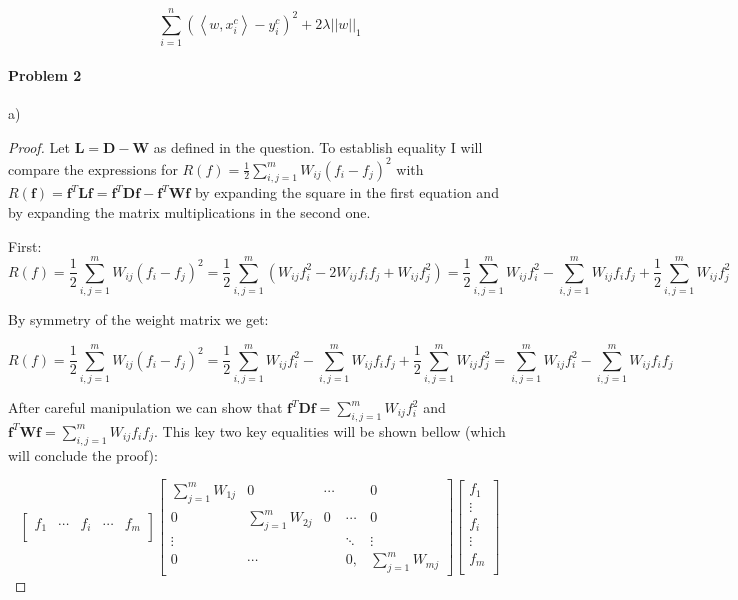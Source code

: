 \documentclass[12pt]{report}
\begin{document}
$$
\boxed{
\sum_{i=1}^n (\left\langle w, x_i^c \right\rangle - y_i^c) ^2 +  2 \lambda ||w||_1
}
$$

\paragraph{Problem 2}
a)


\begin{proof} Let $\mathbf{L} = \mathbf{D} - \mathbf{W}$ as defined in the question. 
To establish equality I will compare the expressions for $R(f) = \frac{1}{2}\sum^m_{i,j=1} W_{ij}(f_i - f_j)^2$ with $R(\mathbf{f}) = \mathbf{f}^T\mathbf{L}\mathbf{f} = \mathbf{f}^T\mathbf{D}\mathbf{f} - \mathbf{f}^T\mathbf{W}\mathbf{f} $ by expanding the square in the first equation and by expanding the matrix multiplications in the second one.

First:
 $$R(f) = \frac{1}{2}\sum^m_{i,j=1} W_{ij}(f_i - f_j)^2 = \frac{1}{2}\sum^m_{i,j=1} (W_{ij}f_i^2 -2W_{ij}f_if_j + W_{ij}f_j^2) = \frac{1}{2}\sum^m_{i,j=1} W_{ij}f_i^2 -\sum^m_{i,j=1}W_{ij}f_if_j + \frac{1}{2}\sum^m_{i,j=1}W_{ij}f_j^2 $$
 
 By symmetry of the weight matrix we get:
 
 $$R(f) = \frac{1}{2}\sum^m_{i,j=1} W_{ij}(f_i - f_j)^2 = \frac{1}{2}\sum^m_{i,j=1} W_{ij}f_i^2 -\sum^m_{i,j=1}W_{ij}f_if_j + \frac{1}{2}\sum^m_{i,j=1}W_{ij}f_j^2 = \sum^m_{i,j=1} W_{ij}f_i^2 -\sum^m_{i,j=1}W_{ij}f_if_j  $$
  
After careful manipulation we can show that 
$\mathbf{f}^T\mathbf{D}\mathbf{f} =  \sum^m_{i,j=1} W_{ij}f_i^2 $ 
and 
$\mathbf{f}^T\mathbf{W}\mathbf{f} = \sum^m_{i,j=1}W_{ij}f_if_j $. This key two key equalities will be shown bellow (which will conclude the proof):
  
$$
\begin{bmatrix}
f_1& \cdots & f_i & \cdots & f_m\\
\end{bmatrix} 
\begin{bmatrix}
\sum_{j=1}^{m}W_{1j} & 0 & \cdots &  & 0 \\
0 & \sum_{j=1}^{m}W_{2j} & 0 & \cdots  & 0 \\
\vdots &   &  &  \ddots  & \vdots \\
0 & \cdots &  & 0, & \sum_{j=1}^{m}W_{mj}
\end{bmatrix} 
\begin{bmatrix}
f_1\\ 
\vdots \\
f_i \\
\vdots \\
f_m\\
\end{bmatrix}
$$


\end{proof}
\end{document}
